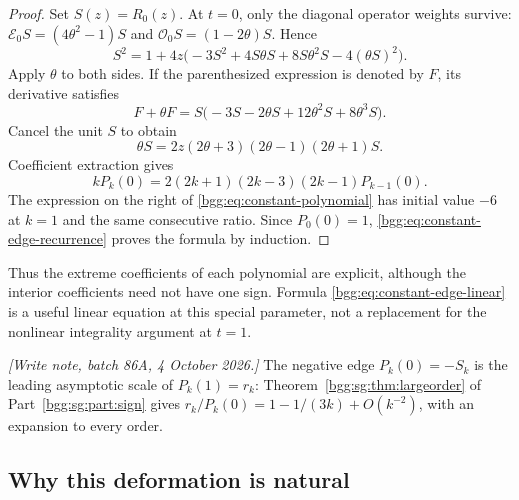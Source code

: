 \documentclass[11pt,a4paper]{article}
\numberwithin{equation}{section}
\theoremstyle{definition}
\theoremstyle{remark}
\theoremstyle{definition}
\newcommand{\Eop}{\mathcal E}
\newcommand{\Oop}{\mathcal O}
\begin{document}
\begin{proof}
Set $S(z)=R_0(z)$. At $t=0$, only the diagonal operator weights survive:
$\Eop_0S=(4\theta^2-1)S$ and $\Oop_0S=(1-2\theta)S$. Hence
\begin{equation}\label{bgg:eq:constant-edge-nonlinear}
 S^2=1+4z\bigl(-3S^2+4S\theta S+8S\theta^2S-4(\theta S)^2\bigr).
\end{equation}
Apply $\theta$ to both sides. If the parenthesized expression is denoted by
$F$, its derivative satisfies
\[
 F+\theta F
 =S\bigl(-3S-2\theta S+12\theta^2S+8\theta^3S\bigr).
\]
Cancel the unit $S$ to obtain
\begin{equation}\label{bgg:eq:constant-edge-linear}
 \theta S=2z(2\theta+3)(2\theta-1)(2\theta+1)S.
\end{equation}
Coefficient extraction gives
\begin{equation}\label{bgg:eq:constant-edge-recurrence}
 kP_k(0)=2(2k+1)(2k-3)(2k-1)P_{k-1}(0).
\end{equation}
The expression on the right of \eqref{bgg:eq:constant-polynomial} has initial
value $-6$ at $k=1$ and the same consecutive ratio. Since $P_0(0)=1$,
\eqref{bgg:eq:constant-edge-recurrence} proves the formula by induction.
\end{proof}

Thus the extreme coefficients of each polynomial are explicit, although the
interior coefficients need not have one sign. Formula
\eqref{bgg:eq:constant-edge-linear} is a useful linear equation at this special
parameter, not a replacement for the nonlinear integrality argument at
$t=1$.

\emph{[Write note, batch 86A, 4 October 2026.]} The negative edge
$P_k(0)=-S_k$ is the leading asymptotic scale of $P_k(1)=r_k$:
Theorem~\ref{bgg:sg:thm:largeorder} of Part~\ref{bgg:sg:part:sign} gives
$r_k/P_k(0)=1-1/(3k)+O(k^{-2})$, with an expansion to every order.

\subsection{Why this deformation is natural}
\end{document}
